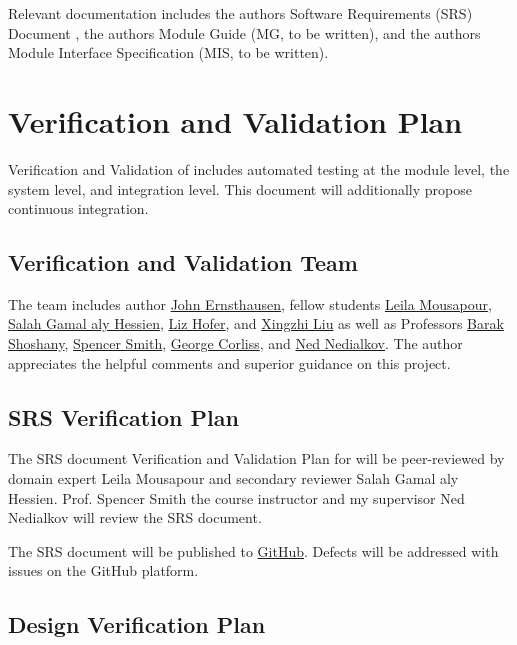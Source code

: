 \documentclass[12pt, titlepage]{article}
\begin{document}
Relevant documentation includes the authors Software Requirements (SRS) Document \cite{SRS}, the
authors Module Guide (MG, to be written), and the authors Module Interface Specification (MIS, to be written).

\section{Verification and Validation Plan}

Verification and Validation of  includes automated testing at the module level,
the system level, and integration level. This document will additionally propose continuous integration.

\subsection{Verification and Validation Team}

The  team includes
author
\href{https://github.com/JohnErnsthausen}{John Ernsthausen},
fellow students
\href{https://github.com/LeilaMousapour}{Leila Mousapour},
\href{https://github.com/salahhessien}{Salah Gamal aly Hessien},
\href{https://github.com/liziscool}{Liz Hofer},
and
\href{https://github.com/XingzhiMac}{Xingzhi Liu} as well as Professors
\href{http://baraksh.com}{Barak Shoshany},
\href{https://github.com/smiths}{Spencer Smith},
\href{https://www.cs.mu.edu/~george/}{George Corliss},
and
\href{http://www.cas.mcmaster.ca/~nedialk}{Ned Nedialkov}.
The author appreciates the helpful comments and superior guidance on this project.

\subsection{SRS Verification Plan}

The SRS document Verification and Validation Plan for  will be peer-reviewed by
domain expert Leila Mousapour and secondary reviewer Salah Gamal aly Hessien.
Prof. Spencer Smith the course instructor and my supervisor Ned Nedialkov will review the SRS
document.

The SRS document will be published to \href{https://github.com/JohnErnsthausen/roc}{GitHub}.
Defects will be addressed with issues on the GitHub platform.

\subsection{Design Verification Plan}
\end{document}
